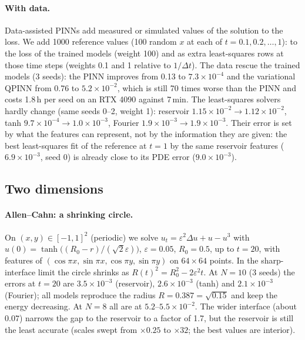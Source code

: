 \documentclass[11pt]{article}
\theoremstyle{remark}\newtheorem*{remark}{Remark}
\begin{document}
\paragraph{With data.} Data-assisted PINNs add measured or simulated values of the solution to the loss. We add 1000
reference values (100 random $x$ at each of $t=0.1,0.2,\dots,1$): to the loss of the trained models (weight 100) and as
extra least-squares rows at those time steps (weights 0.1 and 1 relative to $1/\Delta t$). The data rescue the trained
models (3 seeds): the PINN improves from 0.13 to $7.3\times10^{-4}$ and the variational QPINN from 0.76 to
$5.2\times10^{-2}$, which is still 70 times worse than the PINN and costs 1.8\,h per seed on an RTX 4090 against 7\,min.
The least-squares solvers hardly change (same seeds 0--2, weight 1): reservoir $1.15\times10^{-2}\to1.12\times10^{-2}$,
tanh $9.7\times10^{-4}\to1.0\times10^{-3}$, Fourier $1.9\times10^{-3}\to1.9\times10^{-3}$. Their error is set by what the
features can represent, not by the information they are given: the best least-squares fit of the reference at $t=1$ by the
same reservoir features ($6.9\times10^{-3}$, seed 0) is already close to its PDE error ($9.0\times10^{-3}$).

\subsection{Two dimensions}\label{sec:pf2d}
\paragraph{Allen--Cahn: a shrinking circle.}
On $(x,y)\in[-1,1]^2$ (periodic) we solve $u_t=\varepsilon^2\Delta u+u-u^3$ with
$u(0)=\tanh\big((R_0-r)/(\sqrt2\varepsilon)\big)$, $\varepsilon=0.05$, $R_0=0.5$, up to $t=20$, with features of
$(\cos\pi x,\sin\pi x,\cos\pi y,\sin\pi y)$ on $64\times64$ points. In the sharp-interface limit the circle shrinks as
$R(t)^2=R_0^2-2\varepsilon^2t$. At $N=10$ (3 seeds) the errors at $t=20$ are $3.5\times10^{-3}$ (reservoir),
$2.6\times10^{-3}$ (tanh) and $2.1\times10^{-3}$ (Fourier); all models reproduce the radius $R=0.387=\sqrt{0.15}$ and keep the
energy decreasing. At $N=8$ all are at $5.2$--$5.5\times10^{-2}$. The wider interface (about $0.07$) narrows the gap to the
reservoir to a factor of 1.7, but the reservoir is still the least accurate (scales swept from $\times0.25$ to $\times32$;
the best values are interior).
\end{document}
